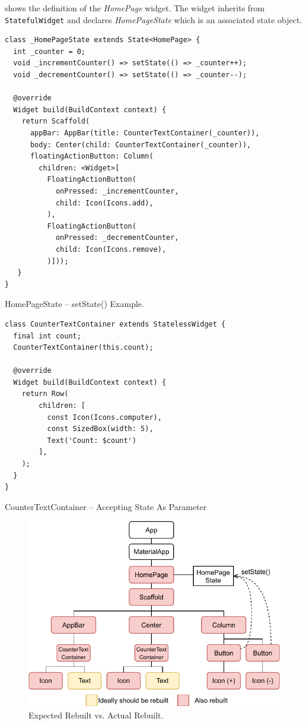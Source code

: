  shows the definition of the \textit{HomePage} widget. The widget inherits from \verb|StatefulWidget| and declares \textit{HomePageState} which is an associated state object.

\begin{listing}[ht]
\begin{verbatim}
class _HomePageState extends State<HomePage> {
  int _counter = 0;
  void _incrementCounter() => setState(() => _counter++);
  void _decrementCounter() => setState(() => _counter--);

  @override
  Widget build(BuildContext context) {
    return Scaffold(
      appBar: AppBar(title: CounterTextContainer(_counter)),
      body: Center(child: CounterTextContainer(_counter)),
      floatingActionButton: Column(
        children: <Widget>[
          FloatingActionButton(
            onPressed: _incrementCounter,
            child: Icon(Icons.add),
          ),
          FloatingActionButton(
            onPressed: _decrementCounter,
            child: Icon(Icons.remove),
          )]));
   }
}
\end{verbatim}
\caption{HomePageState -- setState() Example.}
\label{listing:counter-base-state-homepage}
\end{listing}

\begin{listing}[ht]
\begin{verbatim}
class CounterTextContainer extends StatelessWidget {
  final int count;
  CounterTextContainer(this.count);
  
  @override
  Widget build(BuildContext context) {
    return Row(
        children: [
          const Icon(Icons.computer),
          const SizedBox(width: 5),
          Text('Count: $count')
        ],
    );
  }
}
\end{verbatim}
\caption{CounterTextContainer -- Accepting State As Parameter}
\label{listing:counter-base-text-container}
\end{listing}

\begin{figure}[htp]
    \centering
    \includegraphics[width=0.75\linewidth]{img/flutter/counter-base-setState.pdf}
    \caption{Expected Rebuilt vs. Actual Rebuilt.}
    \label{fig:counter-app-base-build}
\end{figure}

